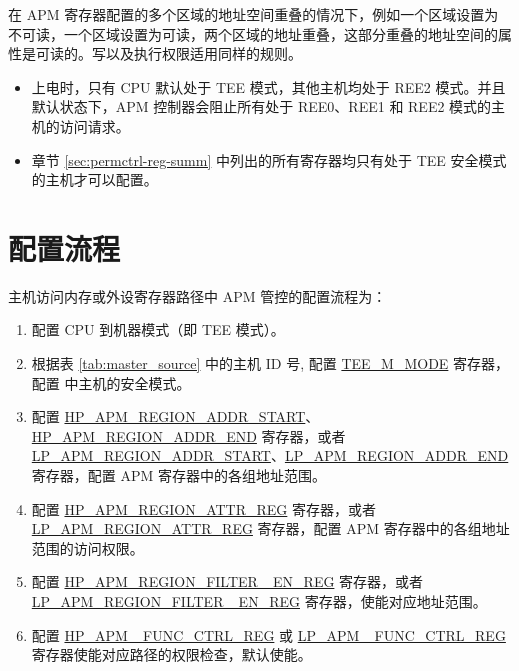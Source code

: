 \documentclass[main\_\_CN.tex]{subfiles}
\begin{document}
在 APM 寄存器配置的多个区域的地址空间重叠的情况下，例如一个区域设置为不可读，一个区域设置为可读，两个区域的地址重叠，这部分重叠的地址空间的属性是可读的。写以及执行权限适用同样的规则。

\begin{tiplisting}
\vspace{-2em}
\begin{itemize}
    \item 上电时，只有 CPU 默认处于 TEE 模式，其他主机均处于 REE2 模式。并且默认状态下，APM 控制器会阻止所有处于 REE0、REE1 和 REE2 模式的主机的访问请求。
    \item 章节 \ref{sec:permctrl-reg-summ}  中列出的所有寄存器均只有处于 TEE 安全模式的主机才可以配置。
\end{itemize}
\end{tiplisting}

\section{配置流程}

主机访问内存或外设寄存器路径中 APM 管控的配置流程为：
\begin{enumerate}

    \item 配置 CPU 到机器模式（即 TEE 模式）。
    \item 根据表 \ref{tab:master_source} 中的主机 ID 号, 配置 \hyperref[fielddesc:TEEM0MODE]{TEE\_M\_MODE} 寄存器，配置 \chipname{} 中主机的安全模式。
    \item 配置 \hyperref[regdesc:HPAPMREGION0ADDRSTARTREG]{HP\_APM\_REGION\_ADDR\_START}、\hyperref[regdesc:HPAPMREGION0ADDRENDREG]{HP\_APM\_REGION\_ADDR\_END} 寄存器，或者 \hyperref[regdesc:LPAPMREGION0ADDRSTARTREG]{LP\_APM\_REGION\_ADDR\_START}、\hyperref[regdesc:LPAPMREGION0ADDRENDREG]{LP\_APM\_REGION\_ADDR\_END} 寄存器，配置 APM 寄存器中的各组地址范围。

    \item 配置 \hyperref[regdesc:HPAPMREGION0ATTRREG]{HP\_APM\_REGION\_ATTR\_REG} 寄存器，或者 \hyperref[regdesc:LPAPMREGION0ATTRREG]{LP\_APM\_REGION\_ATTR\_REG} 寄存器，配置 APM 寄存器中的各组地址范围的访问权限。

    \item 配置 \hyperref[fielddesc:HPAPMREGIONFILTEREN]{HP\_APM\_REGION\_FILTER\_ EN\_REG} 寄存器，或者 \hyperref[fielddesc:LPAPMREGIONFILTEREN]{LP\_APM\_REGION\_FILTER\_ EN\_REG} 寄存器，使能对应地址范围。

    \item 配置 \hyperref[regdesc:HPAPMFUNCCTRLREG]{HP\_APM\_ FUNC\_CTRL\_REG} 或 \hyperref[regdesc:LPAPMFUNCCTRLREG]{LP\_APM \_FUNC\_CTRL\_REG} 寄存器使能对应路径的权限检查，默认使能。
\end{enumerate}
\end{document}
